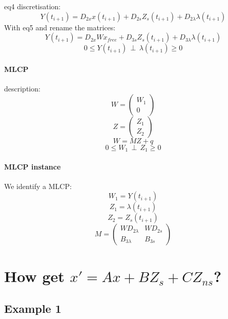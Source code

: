 \documentclass[10pt]{article}
\begin{document}
eq4 discretisation:
\[Y(t_{i+1})=D_{2x}x(t_{i+1})+D_{2s}Z_{s}(t_{i+1}) +D_{2\lambda}\lambda(t_{i+1})\]
With eq5 and rename the matrices:
\[Y(t_{i+1})=D_{2x}Wx_{free}+D_{3s}Z_{s}(t_{i+1})+D_{3\lambda}\lambda(t_{i+1})\]
\[0 \leq Y(t_{i+1}) \, \perp \, \lambda(t_{i+1}) \geq 0\]

\paragraph{MLCP}
description:\\

\[W=\left(\begin{array}{c}W_{1}\\0\end{array}\right)\]
\[Z=\left(\begin{array}{c}Z_{1}\\Z_{2}\end{array}\right)\]
\[W=MZ+q\]
\[0 \leq W_{1} \, \perp \, Z_{1} \geq 0\]
\paragraph{MLCP instance}
We identify a MLCP:\\
\[W_{1} = Y(t_{i+1})\]
\[Z_{1} = \lambda(t_{i+1})\]
\[Z_{2} = Z_{s}(t_{i+1})\]
\[M = \left(\begin{array}{cc}
  WD_{2\lambda}&WD_{2s}\\
B_{3\lambda}&B_{3s}
\end{array}\right)\]
\newpage
\section{How get $x' = Ax+BZ_{s} + CZ_{ns}$?}
\subsection{Example 1}
\begin{figure}[h]
\centerline{
 \scalebox{0.5}{
    
 }
}
\end{figure}
\end{document}
